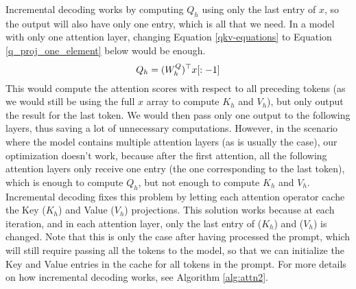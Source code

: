Incremental decoding works by computing $Q_h$ using only the last entry of $x$, so the output will also have only one entry, which is all that we need. In a model with only one attention layer, changing Equation \ref{qkv-equations} to Equation \ref{q_proj_one_element} below would be enough.
\begin{equation}\label{q_proj_one_element}
    Q_h = (W_h^Q)^\top x[ : -1] \\
\end{equation}
This would compute the attention scores with respect to all preceding tokens (as we would still be using the full $x$ array to compute $K_h$ and $V_h$), but only output the result for the last token. We would then pass only one output to the following layers, thus saving a lot of unnecessary computations. However, in the scenario where the model contains multiple attention layers (as is usually the case), our optimization doesn't work, because after the first attention, all the following attention layers only receive one entry (the one corresponding to the last token), which is enough to compute $Q_h$, but not enough to compute $K_h$ and $V_h$. Incremental decoding fixes this problem by letting each attention operator cache the Key ($K_h$) and Value ($V_h$) projections. This solution works because at each iteration, and in each attention layer, only the last entry of ($K_h$) and ($V_h$) is changed. Note that this is only the case after having processed the prompt, which will still require passing all the tokens to the model, so that we can initialize the Key and Value entries in the cache for all tokens in the prompt. For more details on how incremental decoding works, see Algorithm \ref{alg:attn2}.
